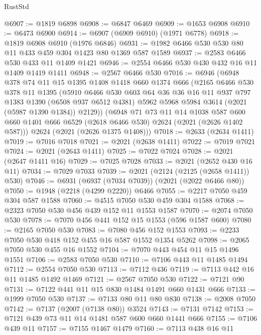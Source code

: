 \begin{lexlean}{RustStd}
\begin{coremodule}
@6907 := @1819 @6898
@6908 := @6847 @6469
@6909 := @1653 @6908
@6910 := @6473 @6900
@6914 := @6907 (@6909 @6910) (@1971 @6778)
@6918 := @1819 @6908 @6910 (@1976 @6846)
@6931 := @1982 @6466 @530 @530 @80 @11 @433 @459 @304 @1423 @80 @1369 @587 @1589
@6937 := @2583 @6466 @530 @433 @11 @1409 @1421
@6946 := @2554 @6466 @530 @430 @432 @16 @11 @1409 @1419 @1411
@6948 := @2567 @6466 @530
@7016 := @6946
    (@6948
      @378
      @74
      @11
      @15
      @1395
      @1408
      @1418
      @660
      @1374
      @666
      (@2165
        @6466
        @530
        @378
        @11
        @1395
        (@5910
          @6466
          @530
          @603
          @64
          @36
          @36
          @16
          @11
          @937
          @797
          @1383
          @1390
          (@6508 @937 @6512 @4381)
          @5962
          @5968
          @5984
          @3614
          (@2021 (@5987 @1390 @1384))
          @2129))
      (@6948
        @71
        @73
        @11
        @14
        @1038
        @587
        @600
        @660
        @1401
        @666
        @6529
        (@2618 @6466 @530)
        @2624
        (@2021 (@2626 @1402 @587)))
      @2624
      (@2021 (@2626 @1375 @1408)))
@7018 := @2633 (@2634 @1411)
@7019 := @7016 @7018
@7021 := @2021 (@2638 @1411)
@7022 := @7019 @7021
@7024 := @2021 (@2643 @1411)
@7025 := @7022 @7024
@7028 := @2021 (@2647 @1411 @16)
@7029 := @7025 @7028
@7033 := @2021 (@2652 @430 @16 @11)
@7034 := @7029 @7033
@7039 := @2021 (@2124 (@2125 (@2658 @1411)) @530)
@7046 := @6931 (@6937 (@7034 @7039)) (@2021 (@2022 @6466 @80))
@7050 := @1948 (@2218 (@4299 @2220)) @6466
@7055 := @2217 @7050 @459 @304 @587 @1588
@7060 := @4515 @7050 @530 @459 @304 @1588
@7068 := @2323 @7050 @530 @456 @439 @152 @11 @1553 @1587
@7070 := @2074 @7050 @530
@7078 := @7070 @456 @441 @152 @15 @1553 (@596 @1587 @600)
@7080 := @2165 @7050 @530
@7083 := @7080 @456 @152 @1553
@7093 := @2233 @7050 @530 @418 @152 @455 @16 @587 @1552 @1354 @5262
@7098 := @2065 @7050 @530 @455 @16 @1552
@7104 := @7070 @443 @454 @11 @15 @1496 @1551
@7106 := @2583 @7050 @530
@7110 := @7106 @443 @11 @1485 @1494
@7112 := @2554 @7050 @530
@7113 := @7112 @436
@7119 := @7113 @442 @16 @11 @1485 @1492 @1469
@7121 := @2567 @7050 @530
@7122 := @7121 @90
@7131 := @7122 @441 @11 @15 @830 @1484 @1491 @660 @1431 @666
@7133 := @1999 @7050 @530
@7137 := @7133 @80 @11 @80 @830
@7138 := @2008 @7050
@7142 := @7137 (@2007 (@7138 @80)) @3524
@7143 := @7131 @7142
@7153 := @7121 @439 @73 @11 @14 @1481 @587 @600 @660 @1441 @666
@7155 := @7106 @439 @11
@7157 := @7155 @1467 @1479
@7160 := @7113 @438 @16 @11

\end{coremodule}
\end{lexlean}
